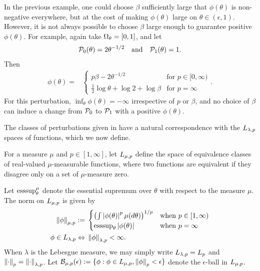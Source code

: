 \begin{ex}
In the previous example, one could choose $\beta$ sufficiently large that
$\phi(\theta)$ is non-negative everywhere, but at the cost of making
$\phi(\theta)$ large on $\theta \in (\epsilon, 1)$. However, it is not always
possible to choose $\beta$ large enough to guarantee positive $\phi(\theta)$.
For example, again take $\Omega_{\theta}=[0,1]$, and let
%
\begin{align*}
%
\pbase(\theta) ={} 2 \theta^{-1/2} \mathand
\palt(\theta) ={} 1.
%
\end{align*}
%
Then
%
\begin{align*}
%
\phi(\theta) ={}&
\begin{cases}
        p\beta - 2 \theta^{-1/2} & \textrm{for }p \in [0, \infty) \\
        \frac{1}{2} \log \theta + \log 2 + \log \beta
            & \textrm{for }p = \infty
\end{cases}.
%
\end{align*}
%
For this perturbation, $\inf_\theta \phi(\theta) = -\infty$ irrespective
of $p$ or $\beta$, and no choice of $\beta$ can induce a change from
$\mathcal{P}_{0}$ to $\mathcal{P}_{1}$ with a positive $\phi(\theta)$.
%
\end{ex}


The classes of perturbations given in  have a natural
correspondence with the ${L_{\lambda, p}}$ spaces of functions, which we now
define.


\begin{defn}
\citep[Sections 5.1-5.2]{dudley:2018:real}
%
For a measure $\mu$ and $p \in [1, \infty]$, let ${L_{\mu,p}}$ define the
space of equivalence classes of real-valued $\mu$-measurable functions,
where two functions are equivalent if they disagree only on a set of
$\mu$-measure zero.

Let $\operatorname*{\mathrm{esssup}}_\theta^\mu$ denote the essential supremum over $\theta$ with
respect to the measure $\mu$. The norm on ${L_{\mu,p}}$ is given by
%
\begin{align*}
%
\norm{\phi}_{\mu,p} :={}&
\begin{cases}
    \left(\int \abs{\phi(\theta)}^p \mu(d\theta)\right)^{1/p}
    & \textrm{when }p \in [1, \infty)\\
    \esssup_{\theta} \abs{\phi(\theta)}
    & \textrm{when }p = \infty
\end{cases}\\
%
\phi \in \lp{\lambda,p} \Leftrightarrow{}& \norm{\phi}_{\lambda,p} < \infty.
%
\end{align*}
%
When $\lambda$ is the  Lebesgue measure, we may simply write ${L_{\lambda,p}} =
{L_{p}}$ and $\left\Vert\cdot\right\Vert_{p} = \left\Vert\cdot\right\Vert_{\lambda,p}$.
%
Let $\mathcal{B}_{\mu,p}(\epsilon) := \{\phi: \phi \in {L_{\mu, p}},
\left\Vert\phi\right\Vert_p < \epsilon \}$ denote the $\epsilon$-ball in ${L_{\mu, p}}$.
%
\end{defn}

